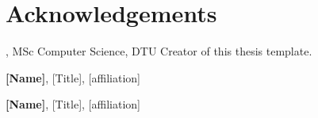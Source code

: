 \section*{Acknowledgements}
\textbf{\thesisauthor}, MSc Computer Science, DTU \newline
Creator of this thesis template.

\textbf{[Name]}, [Title], [affiliation] \newline
[text]

\textbf{[Name]}, [Title], [affiliation] \newline
[text]

